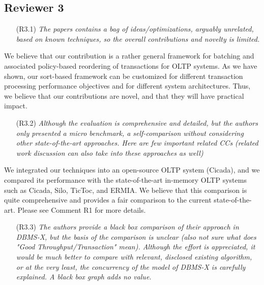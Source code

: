 \documentclass{article}
\newcommand{\todo}[1]{}
\newcommand{\changed}[1]{#1}
\newcommand{\todo}[1]{\textcolor{red}{\bf [TODO!: #1]}}
\newcommand{\changed}[1]{{\color{blue}#1}}
\begin{document}
\subsection{Reviewer 3}

\begin{itemize}
\item[(R3.1)] \emph{The papers contains a bag of ideas/optimizations, arguably unrelated,
	based on known techniques, so the overall contributions and novelty is
	limited.}
\end{itemize}

\changed{
	We believe that our contribution is a rather general framework for batching and associated policy-based reordering of transactions for OLTP systems. As we have shown, our sort-based framework can be customized for different transaction processing performance objectives and for different system architectures. Thus, we believe that our contributions are novel, and that they will have practical impact.
}

\begin{itemize}
\item[(R3.2)] \emph{Although the evaluation is comprehensive and detailed, but the authors
	only presented a micro benchmark, a self-comparison without considering
	other state-of-the-art approaches. Here are few important related CCs
	(related work discussion can also take into these approaches as well)}
\end{itemize}

\changed{
	 We integrated our techniques into an open-source OLTP system (Cicada), and we compared its performance with the state-of-the-art in-memory OLTP systems such as Cicada, Silo, TicToc, and ERMIA. We believe that this comparison is quite comprehensive and provides a fair comparison to the current state-of-the-art. Please see Comment R1 for more details.
}

\begin{itemize}
\item[(R3.3)] \emph{The authors provide a black box comparison of their approach in DBMS-X,
	but the basis of the comparison is unclear (also not sure what does
	"Good Throughput/Transaction" mean). Although the effort is appreciated,
	it would be much better to compare with relevant, disclosed existing
	algorithm, or at the very least, the concurrency of the model of DBMS-X is
	carefully explained. A black box graph adds no value.}
\end{itemize}
\end{document}
